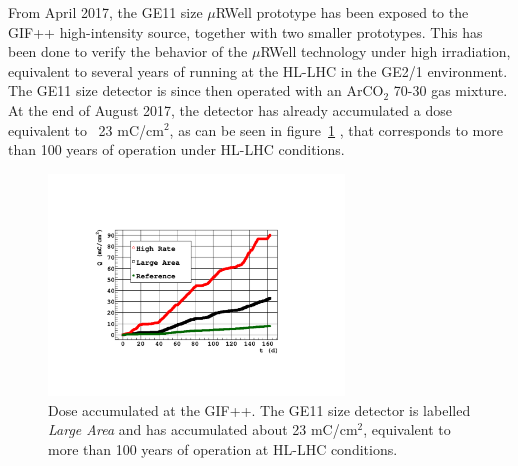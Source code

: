 From April 2017, the GE11 size $\mu$RWell prototype has been exposed to the GIF++ high-intensity source, together with two smaller prototypes. 
This has been done to verify the behavior of the $\mu$RWell technology under high irradiation, equivalent to several years of running at the HL-LHC in the GE2/1 environment. 
The GE11 size detector is since then operated with an ArCO$_2$ 70-30 gas mixture.
At the end of August 2017, the detector has already accumulated a dose equivalent to ~23 mC/cm$^2$, as can be seen in figure~\ref{fig:urwell-int-dose} , that corresponds to more than 100 years of operation under HL-LHC conditions.

%

\begin{figure}[h!]
\centering
\includegraphics[width=0.7\textwidth] {Figures/Muon/microrwell-dose-GIF.pdf}
\caption{Dose accumulated at the GIF++. The GE11 size detector is labelled \textit{Large Area} and has accumulated about 23 mC/cm$^2$, equivalent to more than 100 years of operation at HL-LHC conditions. }
\label{fig:urwell-int-dose}
\end{figure}


